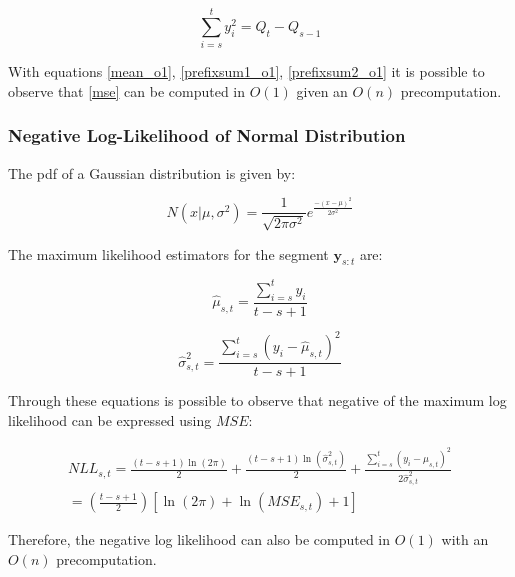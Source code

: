 \begin{equation}
    \label{prefixsum2_o1}
    \sum \limits_{i = s}^{t} y_{i}^{2} = Q_{t} - Q_{s - 1}
\end{equation}

With equations \ref{mean_o1}, \ref{prefixsum1_o1}, \ref{prefixsum2_o1} it is possible to observe that \ref{mse} can be computed in $O(1)$ given an $O(n)$ precomputation.  

\subsubsection{Negative Log-Likelihood of Normal Distribution}

The pdf of a Gaussian distribution is given by:

\begin{equation}
    N(x | \mu, \sigma^{2}) = \frac{1}{\sqrt{2 \pi \sigma^{2}}} e^{\frac{-(x - \mu)^{2}}{2 \sigma^{2}}}
\end{equation}

The maximum likelihood estimators for the segment $\mathbf{y}_{s : t}$ are:

\begin{equation}
    \widehat{\mu}_{s, t} = \frac{\sum \limits_{i = s}^{t} y_{i}}{t - s + 1} 
\end{equation}

\begin{equation}
    \widehat{\sigma}_{s, t}^{2} = \frac{\sum \limits_{i = s}^{t} (y_{i} - \widehat{\mu}_{s, t})^{2}}{t - s + 1} 
\end{equation}

Through these equations is possible to observe that negative of the maximum log likelihood can be expressed using $MSE$:

\begin{equation}
    \begin{aligned}
        NLL_{s, t} = \frac{(t - s + 1) \ln(2 \pi)}{2} + \frac{(t - s + 1) \ln(\widehat{\sigma}_{s, t}^{2})}{2} + \frac{\sum \limits_{i = s}^{t} (y_{i} - \widehat{\mu}_{s, t})^{2}}{2 \widehat{\sigma}_{s, t}^{2}} \\
        = \left( \frac{t - s + 1}{2} \right) [\ln(2 \pi) + \ln(MSE_{s, t}) + 1]
    \end{aligned}
\end{equation}

Therefore, the negative log likelihood can also be computed in $O(1)$ with an $O(n)$ precomputation.


